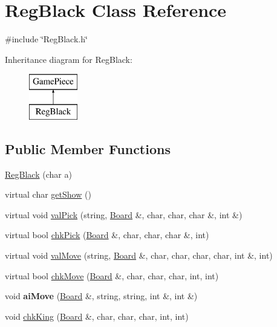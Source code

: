 \hypertarget{class_reg_black}{\section{Reg\-Black Class Reference}
\label{class_reg_black}
}


{\ttfamily \#include \char`\"{}Reg\-Black.\-h\char`\"{}}

Inheritance diagram for Reg\-Black\-:\begin{figure}[H]
\begin{center}
\leavevmode
\includegraphics[height=2.000000cm]{class_reg_black}
\end{center}
\end{figure}
\subsection*{Public Member Functions}
\begin{DoxyCompactItemize}
\item 
\hyperlink{class_reg_black_a1c4f49c27b3ecb11b7be7542f1839e92}{Reg\-Black} (char a)
\item 
virtual char \hyperlink{class_reg_black_a443809b57474b3ccb28ad54f8c5a277c}{get\-Show} ()
\item 
virtual void \hyperlink{class_reg_black_abfcac7c66da4b4220899f2af9703a16a}{val\-Pick} (string, \hyperlink{class_board}{Board} \&, char, char, char \&, int \&)
\item 
virtual bool \hyperlink{class_reg_black_a43474ac9c3b2f0c6f016be88ff037c8f}{chk\-Pick} (\hyperlink{class_board}{Board} \&, char, char, char \&, int)
\item 
virtual void \hyperlink{class_reg_black_a5f2764564af69c686e434310e89255d6}{val\-Move} (string, \hyperlink{class_board}{Board} \&, char, char, char, char, int \&, int)
\item 
virtual bool \hyperlink{class_reg_black_a23733f51cc005f551d077857fd9a5bf1}{chk\-Move} (\hyperlink{class_board}{Board} \&, char, char, char, int, int)
\item 
\hypertarget{class_reg_black_a3fff072004c2858dba01d8bbdd9afd1c}{void {\bfseries ai\-Move} (\hyperlink{class_board}{Board} \&, string, string, int \&, int \&)}\label{class_reg_black_a3fff072004c2858dba01d8bbdd9afd1c}

\item 
void \hyperlink{class_reg_black_a54d15e5fa95efc365752e4a1a352e7b9}{chk\-King} (\hyperlink{class_board}{Board} \&, char, char, char, int, int)
\end{DoxyCompactItemize}
